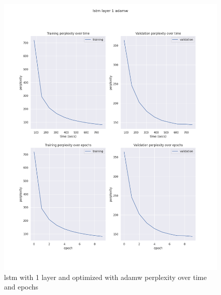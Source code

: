 \documentclass[12pt]{article}
\theoremstyle{definition}
\begin{document}
\begin{figure}[H]
     \centering
     \includegraphics[scale=0.4]{lstm_layer_1_adamw.png}
     \caption{lstm with 1 layer and optimized with adamw perplexity over time and epochs}
\end{figure}
\end{document}
